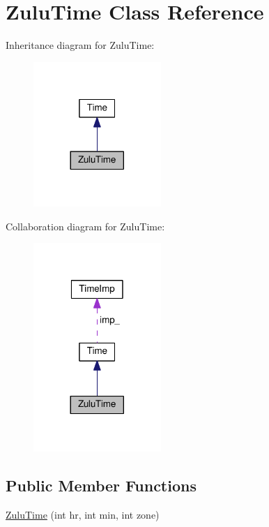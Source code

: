 \hypertarget{classZuluTime}{}\section{Zulu\+Time Class Reference}
\label{classZuluTime}


Inheritance diagram for Zulu\+Time\+:
\nopagebreak
\begin{figure}[H]
\begin{center}
\leavevmode
\includegraphics[width=137pt]{classZuluTime__inherit__graph}
\end{center}
\end{figure}


Collaboration diagram for Zulu\+Time\+:
\nopagebreak
\begin{figure}[H]
\begin{center}
\leavevmode
\includegraphics[width=137pt]{classZuluTime__coll__graph}
\end{center}
\end{figure}
\subsection*{Public Member Functions}
\begin{DoxyCompactItemize}
\item 
\hyperlink{classZuluTime_a8e9a19871eaca29ea45a3154b388c27a}{Zulu\+Time} (int hr, int min, int zone)
\end{DoxyCompactItemize}
